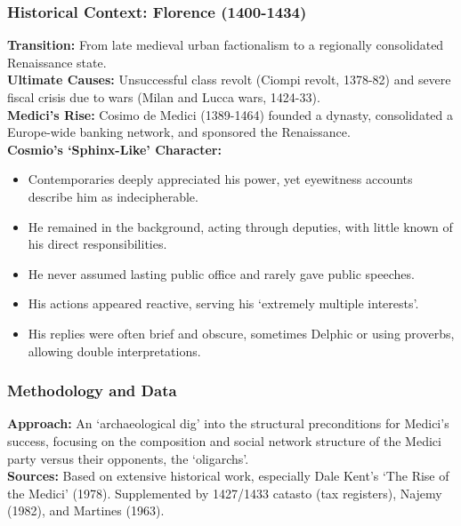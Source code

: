 \documentclass{article}
\begin{document}
    \subsubsection{Historical Context: Florence (1400-1434)}

    \noindent \textbf{Transition:} From late medieval urban factionalism
to a regionally consolidated Renaissance state.\\

    \noindent \textbf{Ultimate Causes:} Unsuccessful class revolt (Ciompi
revolt, 1378-82) and severe fiscal crisis due to wars (Milan and Lucca wars,
1424-33).\\

    \noindent \textbf{Medici's Rise:} Cosimo de Medici (1389-1464) founded a
dynasty, consolidated a Europe-wide banking network, and sponsored the
Renaissance.\\

    \noindent \textbf{Cosmio's `Sphinx-Like' Character:}\
    \begin{itemize}
        \item Contemporaries deeply appreciated his power, yet eyewitness
        accounts describe him as indecipherable.
        \item He remained in the background, acting through deputies, with
        little known of his direct responsibilities.
        \item He never assumed lasting public office and rarely gave public
        speeches.
        \item His actions appeared reactive, serving his `extremely multiple
        interests'.
        \item His replies were often brief and obscure, sometimes Delphic or
        using proverbs, allowing double interpretations.
    \end{itemize}

    \subsubsection{Methodology and Data}

    \noindent \textbf{Approach:} An `archaeological dig' into the structural
preconditions for Medici's success, focusing on the composition and social
network structure of the Medici party versus their opponents, the `oligarchs'.\\

    \noindent \textbf{Sources:} Based on extensive historical work,
especially Dale Kent's `The Rise of the Medici' (1978). Supplemented by
1427/1433 catasto (tax registers), Najemy (1982), and Martines (1963).\\
\end{document}
